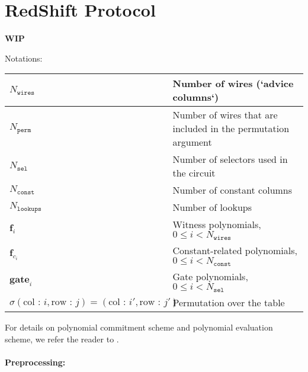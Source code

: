 \section{RedShift Protocol}
\label{section:protocol}
\textbf{WIP}

Notations:

\begin{center}
    \begin{table}[H]
        \begin{tabular}{| l | l |}
            \hline
            $N_{\texttt{wires}}$ & Number of wires (`advice columns`) \\
            \hline
            $N_{\texttt{perm}}$ & Number of wires that are included in the permutation argument \\
            \hline
            $N_{\texttt{sel}}$ & Number of selectors used in the circuit \\
            \hline
            $N_{\texttt{const}}$ & Number of constant columns  \\
            \hline 
            $N_{\texttt{lookups}}$ & Number of lookups \\
            \hline
            $\textbf{f}_i$ & Witness polynomials, $0 \leq i < N_{\texttt{wires}}$  \\
            \hline
            $\textbf{f}_{c_i}$ & Constant-related polynomials, $0 \leq i < N_{\texttt{const}}$  \\
            \hline
            $\textbf{gate}_i$ & Gate polynomials, $0 \leq i < N_{\texttt{sel}}$  \\
            \hline
            $\sigma(\text{col : } i, \text{row : } j) = (\text{col : } i', \text{row : } j')$ & Permutation over the table \\
            \hline
        \end{tabular}
    \end{table}
\end{center}

For details on polynomial commitment scheme and polynomial evaluation scheme, we refer the reader to \cite{cryptoeprint:2019:1400}.

\paragraph{Preprocessing:}


